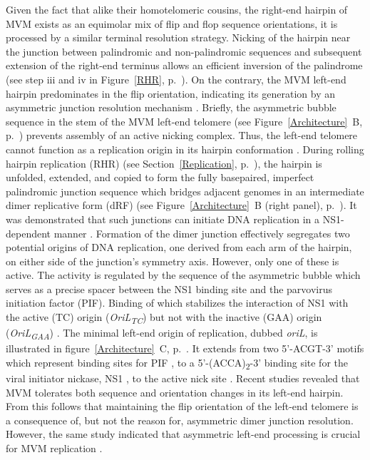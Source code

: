 Given the fact that alike their homotelomeric cousins, the right-end hairpin of MVM exists as an equimolar mix of flip and flop sequence orientations, it is processed by a similar terminal resolution strategy. Nicking of the hairpin near the junction between palindromic and non-palindromic sequences and subsequent extension of the right-end terminus allows an efficient inversion of the palindrome (see step iii and iv in Figure~\ref{RHR}, p.~\pageref{RHR}). On the contrary, the MVM left-end hairpin predominates in the flip orientation, indicating its generation by an asymmetric junction resolution mechanism \cite{pmid12743281}. Briefly, the asymmetric bubble sequence in the stem of the MVM left-end telomere (see Figure~\ref{Architecture}~B, p.~\pageref{Architecture}) prevents assembly of an active nicking complex. Thus, the left-end telomere cannot function as a replication origin in its hairpin conformation \cite{pmid8995615}. During rolling hairpin replication (RHR) (see Section~\ref{Replication}, p.~\pageref{Replication}), the hairpin is unfolded, extended, and copied to form the fully basepaired, imperfect palindromic junction sequence which bridges adjacent genomes in an intermediate dimer replicative form (dRF) (see Figure~\ref{Architecture}~B (right panel), p.~\pageref{Architecture}). It was demonstrated that such junctions can initiate DNA replication in a NS1-dependent manner \cite{pmid8076610, pmid1530771}. Formation of the dimer junction effectively segregates two potential origins of DNA replication, one derived from each arm of the hairpin, on either side of the junction's symmetry axis. However, only one of these is active. The activity is regulated by the sequence of the asymmetric bubble which serves as a precise spacer between the NS1 binding site and the parvovirus initiation factor (PIF). Binding of which stabilizes the interaction of NS1 with the active (TC) origin (\textit{OriL\textsubscript{TC}}) but not with the inactive (GAA) origin (\textit{OriL\textsubscript{GAA}}) \cite{pmid11435581}. The minimal left-end origin of replication, dubbed \textit{oriL}, is illustrated in figure~\ref{Architecture}~C, p.~\pageref{Architecture}. It extends from two 5'-ACGT-3' motifs which represent binding sites for PIF \cite{pmid8995666, pmid9223459, pmid10523663}, to a 5'-(ACCA)\textsubscript{2}-3' binding site for the viral initiator nickase, NS1 \cite{pmid7853501}, to the active nick site \cite{pmid8076610}. Recent studies revealed that MVM tolerates both sequence and orientation changes in its left-end hairpin. From this follows that maintaining the flip orientation of the left-end telomere is a consequence of, but not the reason for, asymmetric dimer junction resolution. However, the same study indicated that asymmetric left-end processing is crucial for MVM replication \cite{pmid22933276}.  

